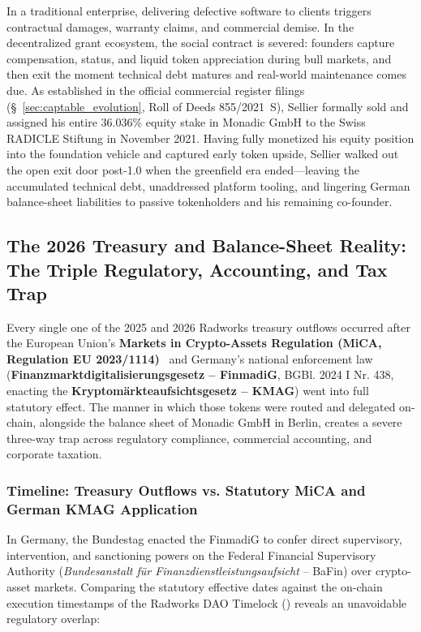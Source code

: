 \documentclass[a4paper,11pt,twoside,parskip=half-,headings=small]{scrartcl}
\begin{document}
In a traditional enterprise, delivering defective software to clients triggers contractual damages, warranty claims, and commercial demise. In the decentralized grant ecosystem, the social contract is severed: founders capture compensation, status, and liquid token appreciation during bull markets, and then exit the moment technical debt matures and real-world maintenance comes due. As established in the official commercial register filings (\S~\ref{sec:captable_evolution}, Roll of Deeds 855/2021~S), Sellier formally sold and assigned his entire 36.036\% equity stake in Monadic GmbH to the Swiss RADICLE Stiftung in November 2021. Having fully monetized his equity position into the foundation vehicle and captured early token upside, Sellier walked out the open exit door post-1.0 when the greenfield era ended---leaving the accumulated technical debt, unaddressed platform tooling, and lingering German balance-sheet liabilities to passive tokenholders and his remaining co-founder.

\subsection{The 2026 Treasury and Balance-Sheet Reality: The Triple Regulatory, Accounting, and Tax Trap}
\label{sec:radicle_balance_sheet_trap}

Every single one of the 2025 and 2026 Radworks treasury outflows occurred after the European Union's \textbf{Markets in Crypto-Assets Regulation (MiCA, Regulation EU 2023/1114)}~\cite{mica2023} and Germany's national enforcement law (\textbf{Finanzmarktdigitalisierungsgesetz -- FinmadiG}, BGBl. 2024 I Nr. 438, enacting the \textbf{Kryptomärkteaufsichtsgesetz -- KMAG}) went into full statutory effect. The manner in which those tokens were routed and delegated on-chain, alongside the balance sheet of Monadic GmbH in Berlin, creates a severe three-way trap across regulatory compliance, commercial accounting, and corporate taxation.

\subsubsection{Timeline: Treasury Outflows vs. Statutory MiCA and German KMAG Application}
\label{sec:outflow_timeline}

In Germany, the Bundestag enacted the FinmadiG to confer direct supervisory, intervention, and sanctioning powers on the Federal Financial Supervisory Authority (\emph{Bundesanstalt für Finanzdienstleistungsaufsicht} -- BaFin) over crypto-asset markets. Comparing the statutory effective dates against the on-chain execution timestamps of the Radworks DAO Timelock () reveals an unavoidable regulatory overlap:
\end{document}

